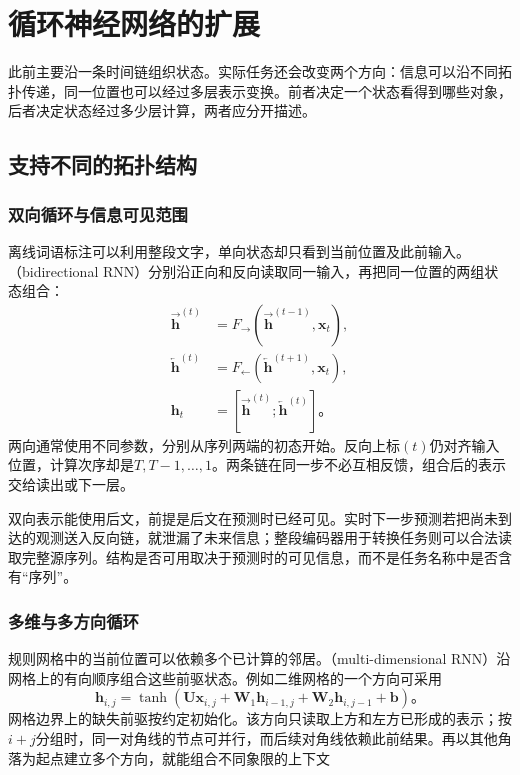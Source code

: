 \section{循环神经网络的扩展}
\label{sec:rnn-extensions}

此前主要沿一条时间链组织状态。实际任务还会改变两个方向：信息可以沿不同拓扑传递，同一位置也可以经过多层表示变换。前者决定一个状态看得到哪些对象，后者决定状态经过多少层计算，两者应分开描述。

\subsection{支持不同的拓扑结构}
\label{sec:rnn-topologies}

\subsubsection{双向循环与信息可见范围}
\label{sec:rnn-bidirectional}

离线词语标注可以利用整段文字，单向状态却只看到当前位置及此前输入。（bidirectional RNN）分别沿正向和反向读取同一输入，再把同一位置的两组状态组合：
\begin{equation}
  \begin{aligned}
    \overrightarrow{\bm{h}}^{(t)}&=F_{\rightarrow}\!\left(
       \overrightarrow{\bm{h}}^{(t-1)},\bm{x}_t\right),\\
    \overleftarrow{\bm{h}}^{(t)}&=F_{\leftarrow}\!\left(
       \overleftarrow{\bm{h}}^{(t+1)},\bm{x}_t\right),\\
    \bm{h}_t&=[\overrightarrow{\bm{h}}^{(t)};
                 \overleftarrow{\bm{h}}^{(t)}]\text{。}
  \end{aligned}
  \label{eq:rnn-bidirectional}
\end{equation}
两向通常使用不同参数，分别从序列两端的初态开始。反向上标$(t)$仍对齐输入位置，计算次序却是$T,T-1,\ldots,1$。两条链在同一步不必互相反馈，组合后的表示交给读出或下一层。

双向表示能使用后文，前提是后文在预测时已经可见。实时下一步预测若把尚未到达的观测送入反向链，就泄漏了未来信息；整段编码器用于转换任务则可以合法读取完整源序列。结构是否可用取决于预测时的可见信息，而不是任务名称中是否含有“序列”。

\subsubsection{多维与多方向循环}
\label{sec:rnn-multidimensional}

规则网格中的当前位置可以依赖多个已计算的邻居。（multi-dimensional RNN）沿网格上的有向顺序组合这些前驱状态。例如二维网格的一个方向可采用
\begin{equation}
  \bm{h}_{i,j}=\tanh\!\left(
     \bm{U}\bm{x}_{i,j}+\bm{W}_1\bm{h}_{i-1,j}
      +\bm{W}_2\bm{h}_{i,j-1}+\bm{b}\right)\text{。}
  \label{eq:rnn-multidimensional}
\end{equation}
网格边界上的缺失前驱按约定初始化。该方向只读取上方和左方已形成的表示；按$i+j$分组时，同一对角线的节点可并行，而后续对角线依赖此前结果。再以其他角落为起点建立多个方向，就能组合不同象限的上下文

